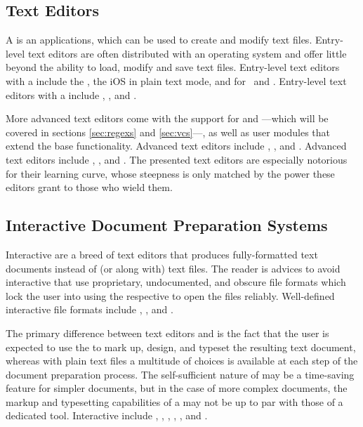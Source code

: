 \documentclass[
  a5paper,10pt,           %
  dvipsnames              %
]{book}
\begin{document}
\subsection{Text Editors}
A  is an applications, which can be used to create and modify
text files. Entry-level text editors are often distributed with an operating
system and offer little beyond the ability to load, modify and save text files.
Entry-level text editors with a  include the ,
the iOS  in plain text mode, and  for \Linux\ and
. Entry-level text editors with a  include
,  , and
.

More advanced text editors come with the support for 
and ---which will be covered in sections \ref{sec:regexs}
and \ref{sec:vcs}---, as well as user modules that extend the base
functionality.  Advanced  text editors include ,
, and . Advanced  text editors include
, , and . The presented 
text editors are especially notorious for their learning curve, whose steepness
is only matched by the power these editors grant to those who wield them.

\subsection{Interactive Document Preparation Systems}
Interactive  are a breed of text
editors that produces fully-formatted text documents instead of (or along with)
text files. The reader is advices to avoid interactive  that use
proprietary, undocumented, and obscure file formats which lock the user into
using the respective  to open the files reliably. Well-defined
interactive  file formats include , ,
and .

The primary difference between text editors and  is the fact that
the user is expected to use the  to mark up, design, and typeset the
resulting text document, whereas with plain text files a multitude of choices is
available at each step of the document preparation process. The self-sufficient
nature of  may be a time-saving feature for simpler documents, but
in the case of more complex documents, the markup and typesetting capabilities
of a  may not be up to par with those of a dedicated tool.
Interactive  include , ,
, , ,  and .
\end{document}
